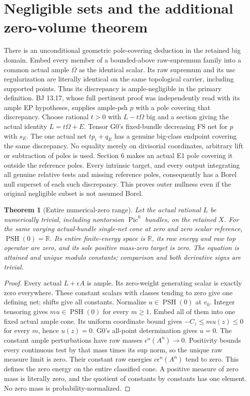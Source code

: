 \documentclass[10pt]{article}
\newtheorem{theorem}{Theorem}[section]
\newcommand{\PSH}{\operatorname{PSH}}
\begin{document}
\section{Negligible sets and the additional zero-volume theorem}
There is an unconditional geometric pole-covering deduction in the
retained big domain. Embed every member of a bounded-above raw-supremum
family into a common actual ample $\Omega$ as the identical scalar.
Its raw supremum and its usc regularization are literally identical on
the same topological carrier, including supported points. Thus its
discrepancy is ample-negligible in the primary definition. BJ 13.17,
whose full pertinent proof was independently read with its ample EP
hypotheses, supplies ample-psh $p$ with a pole covering that discrepancy.
Choose rational $t>0$ with $L-t\Omega$ big and a section giving the
actual identity $L=t\Omega+E$. Tensor G0's fixed-bundle decreasing FS
net for $p$ with $s_E$. The one actual net $tp_i+q_E$ has a genuine
big-class endpoint covering the same discrepancy. No equality merely
on divisorial coordinates, arbitrary lift or subtraction of poles is used.
Section 6 makes an actual E1 pole covering it outside the reference poles.
Every intrinsic target, and every output integrating all genuine relative
tests and missing reference poles, consequently has a Borel null superset
of each such discrepancy. This proves outer nullness even if the original
negligible subset is not assumed Borel.

\begin{theorem}[Entire numerical-zero range]\label{zero}
Let the actual rational $L$ be numerically trivial, including nontorsion
$\operatorname{Pic}^0$ bundles, on the retained $X$. For the same varying
actual-bundle single-net cone at zero and zero scalar reference,
$\PSH(0)=\mathbb R$. Its entire finite-energy space is $\mathbb R$,
its raw energy and raw top operator are zero, and its sole positive
mass-zero target is zero. The equation is attained and unique modulo
constants; comparison and both derivative signs are trivial.
\end{theorem}
\begin{proof}
Every actual $L+\epsilon A$ is ample. Its zero-weight generating scalar
is exactly zero everywhere. These constant scalars with classes tending
to zero give one defining net; shifts give all constants.
Normalize $u\in\PSH(0)$ at $v_0$. Integer tensoring gives $mu\in\PSH(0)$
for every $m\geq1$. Embed all of them into one fixed actual ample cone.
Its uniform coordinate bound gives $-C_z\leq mu(z)\leq0$ for every
$m$, hence $u(z)=0$. G0's all-point determination gives $u=0$.
The constant ample perturbations have raw masses $\epsilon^n(A^n)\to0$.
Positivity bounds every continuous test by that mass times its sup norm,
so the unique raw measure limit is zero. Their constant raw energies
$c\epsilon^n(A^n)$ tend to zero. This defines the zero energy on the
entire classified cone. A positive measure of zero mass is literally
zero, and the quotient of constants by constants has one element.
No zero mass is probability-normalized.
\end{proof}
\end{document}
